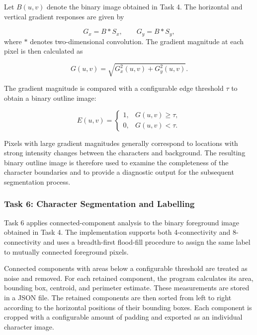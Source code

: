 \documentclass[conference]{IEEEtran}
\begin{document}
Let $B(u,v)$ denote the binary image obtained in Task 4. The horizontal
and vertical gradient responses are given by

\begin{equation}
G_x=B*S_x,
\qquad
G_y=B*S_y,
\label{eq:sobel_responses}
\end{equation}
where $*$ denotes two-dimensional convolution. The gradient magnitude
at each pixel is then calculated as

\begin{equation}
G(u,v)
=
\sqrt{G_x^2(u,v)+G_y^2(u,v)}.
\label{eq:gradient_magnitude}
\end{equation}

The gradient magnitude is compared with a configurable edge threshold
$\tau$ to obtain a binary outline image:

\begin{equation}
E(u,v)
=
\begin{cases}
1, & G(u,v)\geq\tau,\\[4pt]
0, & G(u,v)<\tau.
\end{cases}
\label{eq:outline_threshold}
\end{equation}

Pixels with large gradient magnitudes generally correspond to locations
with strong intensity changes between the characters and background.
The resulting binary outline image is therefore used to examine the
completeness of the character boundaries and to provide a diagnostic
output for the subsequent segmentation process.

\subsubsection{Task 6: Character Segmentation and Labelling}

Task 6 applies connected-component analysis to the binary foreground
image obtained in Task 4. The implementation supports both
4-connectivity and 8-connectivity and uses a breadth-first flood-fill
procedure to assign the same label to mutually connected foreground
pixels.

Connected components with areas below a configurable threshold are
treated as noise and removed. For each retained component, the program
calculates its area, bounding box, centroid, and perimeter estimate.
These measurements are stored in a JSON file. The retained components
are then sorted from left to right according to the horizontal
positions of their bounding boxes. Each component is cropped with a
configurable amount of padding and exported as an individual character
image.
\end{document}

